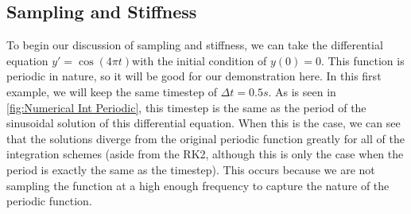 \documentclass[12pt]{report}
\begin{document}
\subsection{Sampling and Stiffness}\label{sampling and stiffness}
 To begin our discussion of sampling and stiffness, we can take the differential equation $y'=\cos(4\pi t)$with the initial condition of $y(0)=0$. This function is periodic in nature, so it will be good for our demonstration here. In this first example, we will keep the same timestep of $\Delta t=0.5s$. As is seen in \ref{fig:Numerical Int Periodic}, this timestep is the same as the period of the sinusoidal solution of this differential equation. When this is the case, we can see that the solutions diverge from the original periodic function greatly for all of the integration schemes (aside from the RK2, although this is only the case when the period is exactly the same as the timestep). This occurs because we are not sampling the function at a high enough frequency to capture the nature of the periodic function.
\end{document}
